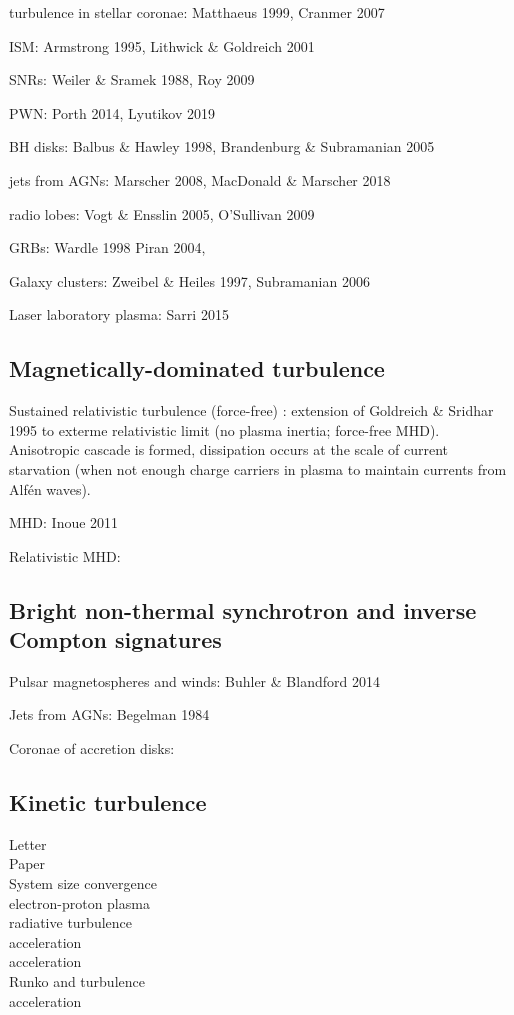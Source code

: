 \documentclass[usenatbib,twocolumn]{aastex63}
\begin{document}
turbulence in stellar coronae:
Matthaeus 1999, Cranmer 2007

ISM:
Armstrong 1995, Lithwick \& Goldreich 2001

SNRs:
Weiler \& Sramek 1988, Roy 2009

PWN:
Porth 2014, Lyutikov 2019

BH disks:
Balbus \& Hawley 1998, Brandenburg \& Subramanian 2005

jets from AGNs:
Marscher 2008, MacDonald \& Marscher 2018
\citep{MacDonald_2018}

radio lobes:
Vogt \& Ensslin 2005, O'Sullivan 2009

GRBs:
Wardle 1998
Piran 2004, 
\citep{Kumar_2009}

Galaxy clusters:
Zweibel \& Heiles 1997, Subramanian 2006

Laser laboratory plasma:
Sarri 2015


\subsection{Magnetically-dominated turbulence}

Sustained relativistic turbulence (force-free)
\citep{Thompson_1998}: extension of Goldreich \& Sridhar 1995 to exterme relativistic limit (no plasma inertia; force-free MHD).
Anisotropic cascade is formed, dissipation occurs at the scale of current starvation (when not enough charge carriers in plasma to maintain currents from Alf\'en waves).

MHD:
\citep{Cho_2005}
Inoue 2011
\citep{Cho_2014}
\citep{Zrake_2016}

Relativistic MHD:
\citep{Zrake_2012}
\citep{Zrake_2014}

\subsection{Bright non-thermal synchrotron and inverse Compton signatures}
Pulsar magnetospheres and winds:
Buhler \& Blandford 2014

Jets from AGNs: Begelman 1984

Coronae of accretion disks:
\citep{Yuan_2014}


\subsection{Kinetic turbulence}

\citep{Zhdankin_2017a} Letter\\
\citep{Zhdankin_2017b} Paper\\
\citep{Zhdankin_2018} System size convergence\\
\citep{Zhdankin_2019a} electron-proton plasma\\
\citep{Zhdankin_2019b} radiative turbulence\\
\citep{Comisso_2018} acceleration\\
\citep{Wong_2019} acceleration\\
\citep{Nattila_2019} Runko and turbulence\\
\citep{Comisso_2019} acceleration\\
\end{document}
